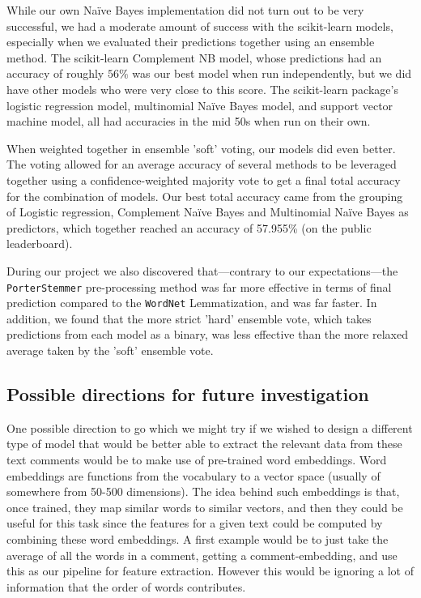 \documentclass[letterpaper, 11pt]{article}
\begin{document}
While our own Na\"ive Bayes implementation did not turn out to be very successful, we had a moderate amount of success with the scikit-learn models, especially when we evaluated their predictions together using an ensemble method. The scikit-learn Complement NB model, whose predictions had an accuracy of roughly $56\%$ was our best model when run independently, but we did have other models who were very close to this score.  The scikit-learn package's logistic regression model, multinomial Na\"ive Bayes model, and support vector machine model, all had accuracies in the mid 50s when run on their own. 

When weighted together in ensemble 'soft' voting, our models did even better. The voting allowed for an average accuracy of several methods to be leveraged together using a confidence-weighted majority vote to get a final total accuracy for the combination of models. Our best total accuracy came from the grouping of Logistic regression, Complement Na\"ive Bayes and Multinomial Na\"ive Bayes as predictors, which together reached an accuracy of 57.955\% (on the public leaderboard).

During our project we also discovered that---contrary to our expectations---the \texttt{PorterStemmer} pre-processing method was far more effective in terms of final prediction compared to the \texttt{WordNet} Lemmatization, and was far faster. In addition, we found that the more strict 'hard' ensemble vote, which takes predictions from each model as a binary, was less effective than the more relaxed average taken by the 'soft' ensemble vote.  

\subsection{Possible directions for future investigation}
One possible direction to go which we might try if we wished to design a different type of model that would be better able to extract the relevant data from these text comments would be to make use of pre-trained word embeddings.  Word embeddings are functions from the vocabulary to a vector space (usually of somewhere from 50-500 dimensions).  The idea behind such embeddings is that, once trained, they map similar words to similar vectors, and then they could be useful for this task since the features for a given text could be computed by combining these word embeddings.  A first example would be to just take the average of all the words in a comment, getting a comment-embedding, and use this as our pipeline for feature extraction.  However this would be ignoring a lot of information that the order of words contributes.
\end{document}
